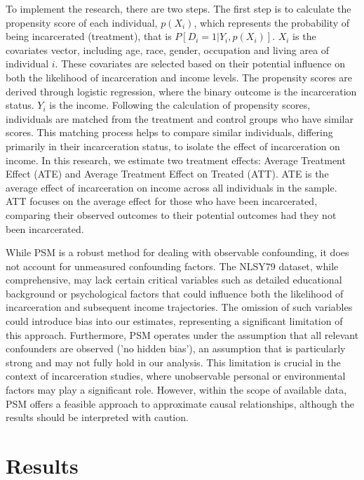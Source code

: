 \documentclass{article}[12pt]
\begin{document}
To implement the research, there are two steps. The first step is to calculate the propensity score of each individual, $p(X_i)$, which represents the probability of being incarcerated (treatment), that is $P[D_i=1|Y_{i}, p(X_i)]$. $X_i$ is the covariates vector, including age, race, gender, occupation and living area of individual $i$. These covariates are selected based on their potential influence on both the likelihood of incarceration and income levels. The propensity scores are derived through logistic regression, where the binary outcome is the incarceration status. $Y_i$ is the income. Following the calculation of propensity scores, individuals are matched from the treatment and control groups who have similar scores. This matching process helps to compare similar individuals, differing primarily in their incarceration status, to isolate the effect of incarceration on income. In this research, we estimate two treatment effects: Average Treatment Effect (ATE) and Average Treatment Effect on Treated (ATT). ATE is the average effect of incarceration on income across all individuals in the sample. ATT focuses on the average effect for those who have been incarcerated, comparing their observed outcomes to their potential outcomes had they not been incarcerated. 
\par
While PSM is a robust method for dealing with observable confounding, it does not account for unmeasured confounding factors. The NLSY79 dataset, while comprehensive, may lack certain critical variables such as detailed educational background or psychological factors that could influence both the likelihood of incarceration and subsequent income trajectories. The omission of such variables could introduce bias into our estimates, representing a significant limitation of this approach. Furthermore, PSM operates under the assumption that all relevant confounders are observed ('no hidden bias'), an assumption that is particularly strong and may not fully hold in our analysis. This limitation is crucial in the context of incarceration studies, where unobservable personal or environmental factors may play a significant role. However, within the scope of available data, PSM offers a feasible approach to approximate causal relationships, although the results should be interpreted with caution. 
\par







\section{Results} %
\end{document}

